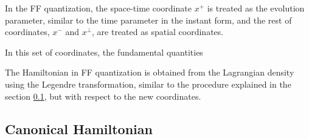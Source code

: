 \documentclass[11pt,a4paper,twoside,pdf]{article}
\numberwithin{equation}{section}
\begin{document}
In the FF quantization, the space-time coordinate $x^+$ is treated as the evolution 
parameter, similar to the time parameter in the instant form, and the rest of 
coordinates, $x^-$ and $x^\perp$, are treated as spatial coordinates.

In this set of coordinates, the fundamental quantities 

The Hamiltonian in FF quantization is obtained from the Lagrangian density using 
the Legendre transformation, similar to the procedure explained in the section
\ref{sec:canonical_hamiltonian}, but with respect to the new coordinates.

\subsection{Canonical Hamiltonian}\label{sec:canonical_hamiltonian}
\end{document}
